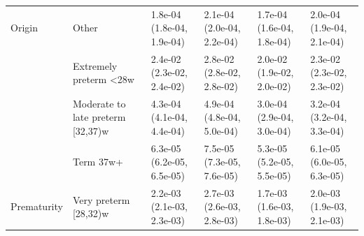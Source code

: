 \documentclass[smallextended]{svjour3} %
\begin{document}
\begin{landscape}
\begin{table}[t]
\begin{tabular}{llllll}
\multirow{-4}{*}{\raggedright\arraybackslash Origin} & Other & 1.8e-04 (1.8e-04, 1.9e-04) & 2.1e-04 (2.0e-04, 2.2e-04) & 1.7e-04 (1.6e-04, 1.8e-04) & 2.0e-04 (1.9e-04, 2.1e-04)\\
\cmidrule{1-6}
 & Extremely preterm <28w & 2.4e-02 (2.3e-02, 2.4e-02) & 2.8e-02 (2.8e-02, 2.8e-02) & 2.0e-02 (1.9e-02, 2.0e-02) & 2.3e-02 (2.3e-02, 2.3e-02)\\

 & Moderate to late preterm [32,37)w & 4.3e-04 (4.1e-04, 4.4e-04) & 4.9e-04 (4.8e-04, 5.0e-04) & 3.0e-04 (2.9e-04, 3.0e-04) & 3.2e-04 (3.2e-04, 3.3e-04)\\

 & Term 37w+ & 6.3e-05 (6.2e-05, 6.5e-05) & 7.5e-05 (7.3e-05, 7.6e-05) & 5.3e-05 (5.2e-05, 5.5e-05) & 6.1e-05 (6.0e-05, 6.3e-05)\\

\multirow{-4}{*}{\raggedright\arraybackslash Prematurity} & Very preterm [28,32)w & 2.2e-03 (2.1e-03, 2.3e-03) & 2.7e-03 (2.6e-03, 2.8e-03) & 1.7e-03 (1.6e-03, 1.8e-03) & 2.0e-03 (1.9e-03, 2.1e-03)\\
\bottomrule
\end{tabular}
\end{table}
\end{landscape}

\clearpage
\end{document}
